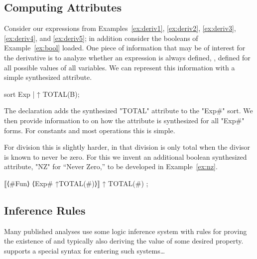 \documentclass[11pt]{article} %
\begin{document}
\subsection{Computing Attributes}

\begin{example}\label{ex:total}
  Consider our expressions from Examples~\ref{ex:deriv1}, \ref{ex:deriv2}, \ref{ex:deriv3},
  \ref{ex:deriv4}, and \ref{ex:deriv5}; in addition consider the booleans of Example~\ref{ex:bool}
  loaded.  One piece of information that may be of interest for the derivative is to analyze whether
  an expression is always defined, \ie, defined for all possible values of all variables. We can
  represent this information with a \HAX simple synthesized attribute.
\begin{code}
sort Exp | ↑ TOTAL(B);
\end{code}
  The declaration adds the synthesized "TOTAL" attribute to the "Exp#" sort.  We then provide
  information to \HAX on how the attribute is synthesized for all "Exp#" forms. For constants and
  most operations this is simple.
  For division this is slightly harder, in that division is only total when the divisor is known to
  never be zero. For this we invent an additional boolean synthesized attribute, "NZ" for ``Never
  Zero,'' to be developed in Example~\ref{ex:nz}.
\begin{code}[firstnumber=last]
⟦⟨#Fun⟩ ⟨Exp# ↑TOTAL(#)⟩⟧ ↑ TOTAL(#) ;
\end{code}
\end{example}

\subsection{Inference Rules}

Many published analyses use some logic inference system with rules for proving the existence of and
typically also deriving the value of some desired property.  \HAX supports a special syntax for
entering such systems…\TBD
\end{document}
